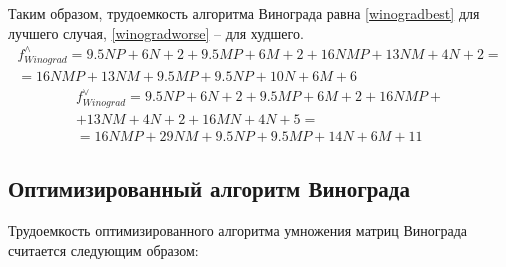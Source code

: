 Таким образом, трудоемкость алгоритма Винограда равна \ref{winogradbest} для
лучшего случая, \ref{winogradworse} -- для худшего.
\begin{multline}\label{winogradbest}
    f_{Winograd}^{\wedge} = 9.5NP + 6N + 2 +
                            9.5MP + 6M + 2 + 16NMP + 13NM + 4N + 2 = \\
                            = 16NMP + 13NM +9.5MP + 9.5NP + 10N + 6M + 6
\end{multline}
\begin{multline}\label{winogradworse}
    f_{Winograd}^{\vee} = 9.5NP + 6N + 2 + 9.5MP + 6M + 2 + 16NMP + \\
                            + 13NM + 4N + 2 + 16MN + 4N + 5 = \\
                        = 16NMP + 29NM +9.5NP + 9.5 MP + 14N + 6M + 11
\end{multline}

\subsection{Оптимизированный алгоритм Винограда}

Трудоемкость оптимизированного алгоритма умножения матриц Винограда считается следующим образом:

